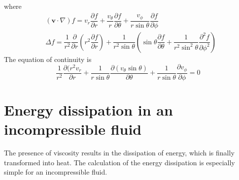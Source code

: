 \documentclass[conference]{IEEEtran}
\theoremstyle{definition}
\theoremstyle{remark}
\begin{document}
    where
    \begin{align*}
        &(\mathbf{v} \cdot \nabla) f = v_r \dfrac{\partial f}{\partial r} + \dfrac{v_\theta}r \dfrac{\partial f}{\partial \theta} + \dfrac{v_\phi}{r \sin\theta} \dfrac{\partial f}{\partial \phi} \\
        &\Delta f = \dfrac1{r^2} \dfrac{\partial}{\partial r} \left( r^2 \dfrac{\partial f}{\partial r} \right) + \dfrac1{r^2 \sin \theta} \left( \sin\theta \dfrac{\partial f}{\partial \theta} +\dfrac1{r^2\sin^2\theta} \dfrac{\partial^2 f}{\partial \phi^2} \right)
    \end{align*}
    The equation of continuity is
    \begin{equation}
        \dfrac1{r^2} \dfrac{\partial (r^2 v_r}{\partial r} + \dfrac1{r\sin\theta} \dfrac{\partial (v_\theta \sin\theta)}{\partial \theta} + \dfrac1{r\sin\theta} \dfrac{\partial v_\phi}{\partial \phi} = 0
    \end{equation}

    \section{Energy dissipation in an incompressible fluid}
    The presence of viscosity results in the dissipation of energy, which is finally transformed into heat. The calculation of the energy dissipation is especially simple for an incompressible fluid.
\end{document}
